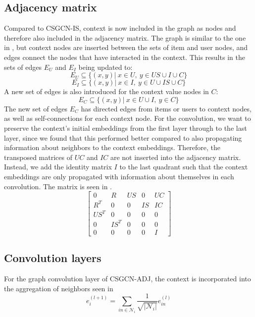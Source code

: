 \subsection{Adjacency matrix}\label{subsec:csgcn_adj_adj_mat}
Compared to CSGCN-IS, context is now included in the graph as nodes and therefore also included in the adjacency matrix.
The graph is similar to the one in , but context nodes are inserted between the sets of item and user nodes, and edges connect the nodes that have interacted in the context.
This results in the sets of edges $E_U$ and $E_I$ being updated to:
$$E_U \subseteq \{ (x,y) | \: x \in U, \: y \in US \cup I \cup C \}$$
$$E_I \subseteq \{ (x,y) | \: x \in I, \: y \in U \cup IS \cup C \}$$
A new set of edges is also introduced for the context value nodes in $C$:
$$E_C \subseteq \{ (x,y) | \: x \in U \cup I, \: y \in C \}$$
The new set of edges $E_C$ has directed edges from items or users to context nodes, as well as self-connections for each context node.
For the convolution, we want to preserve the context's initial embeddings from the first layer through to the last layer, since we found that this performed better compared to also propagating information about neighbors to the context embeddings.
Therefore, the transposed matrices of $UC$ and $IC$ are not inserted into the adjacency matrix.
Instead, we add the identity matrix $I$ to the last quadrant such that the context embeddings are only propagated with information about themselves in each convolution.
The matrix is seen in .
\begin{equation}\label{csgcn_adj_adj_mat}
    \begin{bmatrix}
    0 & R & US & 0 & UC\\
    R^T & 0 & 0 & IS & IC\\
    US^T & 0 & 0 & 0 & 0\\
    0 & IS^T & 0 & 0 & 0 \\
    0 & 0 & 0 & 0 & I
    \end{bmatrix}
\end{equation}

\subsection{Convolution layers}\label{subsec:csgcn_adj_conv_layer}
For the graph convolution layer of CSGCN-ADJ, the context is incorporated into the aggregation of neighbors seen in 
\begin{equation}\label{eq:csgcn_adj_gc_layer_item}
    e_{i}^{(l+1)}=\sum_{in\in \mathcal{N}_{i}}\frac{1}{\sqrt{|\mathcal{N}_{i}|} }e_{in}^{(l)}
\end{equation}

